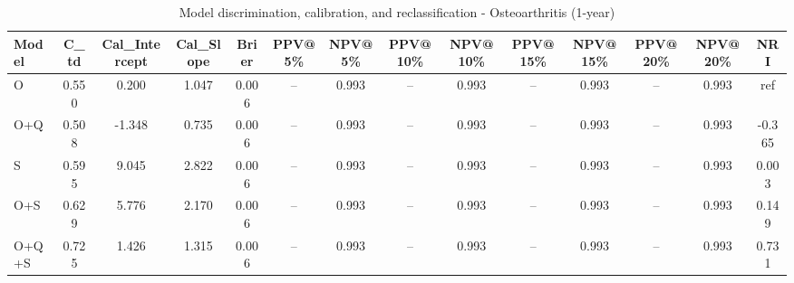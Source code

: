 \begin{table}[htbp]
\centering
\small
\caption{Model discrimination, calibration, and reclassification - Osteoarthritis (1-year)}
\label{tab:perf_osteoarthritis_1y}
\begin{tabular}{lccccccccccccc}
\toprule
Model & C\_td & Cal\_Intercept & Cal\_Slope & Brier & PPV@5\% & NPV@5\% & PPV@10\% & NPV@10\% & PPV@15\% & NPV@15\% & PPV@20\% & NPV@20\% & NRI \\
\midrule
O & 0.550 & 0.200 & 1.047 & 0.006 & -- & 0.993 & -- & 0.993 & -- & 0.993 & -- & 0.993 & ref \\
O+Q & 0.508 & -1.348 & 0.735 & 0.006 & -- & 0.993 & -- & 0.993 & -- & 0.993 & -- & 0.993 & -0.365 \\
S & 0.595 & 9.045 & 2.822 & 0.006 & -- & 0.993 & -- & 0.993 & -- & 0.993 & -- & 0.993 & 0.003 \\
O+S & 0.629 & 5.776 & 2.170 & 0.006 & -- & 0.993 & -- & 0.993 & -- & 0.993 & -- & 0.993 & 0.149 \\
O+Q+S & 0.725 & 1.426 & 1.315 & 0.006 & -- & 0.993 & -- & 0.993 & -- & 0.993 & -- & 0.993 & 0.731 \\
\bottomrule
\end{tabular}
\end{table}